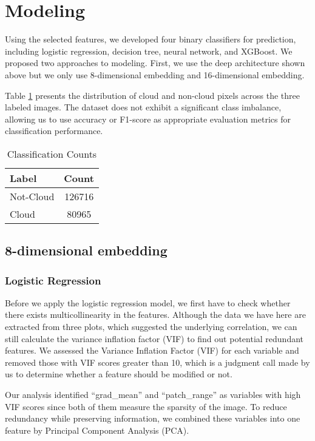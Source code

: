 \documentclass[10pt,letterpaper]{article}
\begin{document}
\section{Modeling}

Using the selected features, we developed four binary classifiers for prediction, including logistic regression, decision tree, neural network, and XGBoost. We proposed two approaches to modeling. First, we use the deep architecture shown above but we only use 8-dimensional embedding and 16-dimensional embedding. 

Table \ref{tab:classification_counts} presents the distribution of cloud and non-cloud pixels across the three labeled images. The dataset does not exhibit a significant class imbalance, allowing us to use accuracy or F1-score as appropriate evaluation metrics for classification performance.

\begin{table}[h]
    \centering
    \begin{tabular}{lc}
        \toprule
        Label    & Count  \\
        \midrule
        Not-Cloud  & 126716 \\
        Cloud      & 80965  \\
        \bottomrule
    \end{tabular}
    \caption{Classification Counts}
    \label{tab:classification_counts}
\end{table}

\subsection{8-dimensional embedding}

\subsubsection{Logistic Regression}

Before we apply the logistic regression model, we first have to check whether there exists multicollinearity in the features. Although the data we have here are extracted from three plots, which suggested the underlying correlation, we can still calculate the variance inflation factor (VIF) to find out potential redundant features. We assessed the Variance Inflation Factor (VIF) for each variable and removed those with VIF scores greater than 10, which is a judgment call made by us to determine whether a feature should be modified or not.

Our analysis identified “grad\_mean” and “patch\_range” as variables with high VIF scores since both of them measure the sparsity of the image. To reduce redundancy while preserving information, we combined these variables into one feature by Principal Component Analysis (PCA). 
\end{document}
